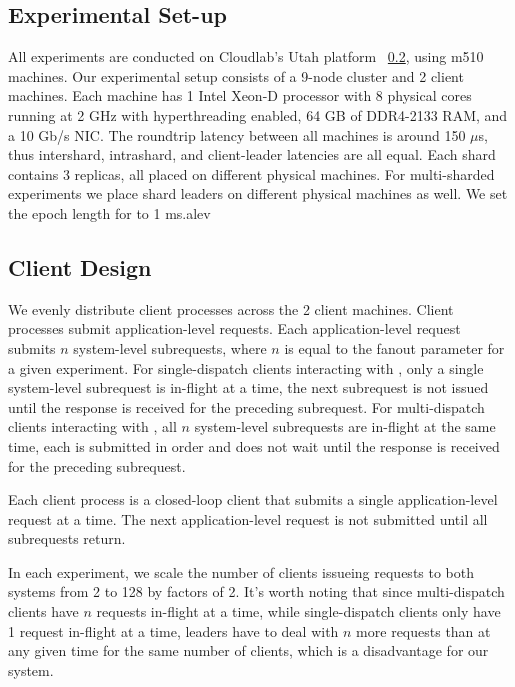 \subsection{Experimental Set-up}
All experiments are conducted on Cloudlab's Utah platform ~\ref{}, using m510 machines. 
Our experimental setup consists of a 9-node cluster and 2 client machines. 
Each machine has 1 Intel Xeon-D processor with 8 physical cores running at 2 GHz with hyperthreading enabled, 64 GB of DDR4-2133 RAM, and a 10 Gb/s NIC. 
The roundtrip latency between all machines is around 150 $\mu$s, thus intershard, intrashard, and client-leader latencies are all equal. 
Each shard contains 3 replicas, all placed on different physical machines. For multi-sharded experiments we place shard leaders on different physical machines as well. 
We set the epoch length for \system to 1 ms.alev


\subsection{Client Design}
We evenly distribute client processes across the 2 client machines. Client processes submit application-level requests. Each application-level request submits $n$ system-level subrequests, where $n$ is equal to the fanout parameter for a given experiment. For single-dispatch clients interacting with \mpaxos, only a single system-level subrequest is in-flight at a time, the next subrequest is not issued until the response is received for the preceding subrequest. For multi-dispatch clients interacting with \system, all $n$ system-level subrequests are in-flight at the same time, each is submitted in order and does not wait until the response is received for the preceding subrequest.

Each client process is a closed-loop client that submits a single application-level request at a time. The next application-level request is not submitted until all subrequests return. 

In each experiment, we scale the number of clients issueing requests to both systems from 2 to 128 by factors of 2. It's worth noting that since multi-dispatch clients have $n$ requests in-flight at a time, while single-dispatch clients only have 1 request in-flight at a time, \system leaders have to deal with $n$ more requests than \mpaxos at any given time for the same number of clients, which is a disadvantage for our system.


